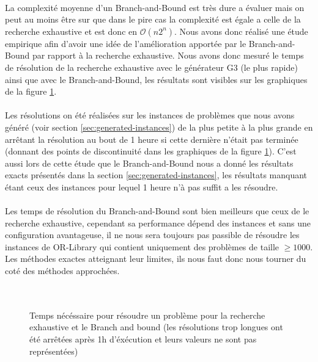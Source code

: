 \documentclass[12pt,letterpaper,twoside]{article}
\begin{document}
			\paragraph*{}
				La complexité moyenne d'un Branch-and-Bound est très dure a évaluer mais on peut au moins être sur que dans le pire cas la complexité est égale a celle de la recherche exhaustive et est donc en \(\mathcal{O}(n2^n)\). Nous avons donc réalisé une étude empirique afin d'avoir une idée de l'amélioration apportée par le Branch-and-Bound par rapport à la recherche exhaustive. Nous avons donc mesuré le temps de résolution de la recherche exhaustive avec le générateur G3 (le plus rapide) ainsi que avec le Branch-and-Bound, les résultats sont visibles sur les graphiques de la figure \ref{figure:plots/exhaustive_bnb_time}.
			\paragraph*{}
				Les résolutions on été réalisées sur les instances de problèmes que nous avons généré (voir section \ref{sec:generated-instances}) de la plus petite à la plus grande en arrêtant la résolution au bout de 1 heure si cette dernière n'était pas terminée (donnant des points de discontinuité dans les graphiques de la figure \ref{figure:plots/exhaustive_bnb_time}). C'est aussi lors de cette étude que le Branch-and-Bound nous a donné les résultats exacts présentés dans la section \ref{sec:generated-instances}, les résultats manquant étant ceux des instances pour lequel 1 heure n'à pas suffit a les résoudre.
			\paragraph*{}
				Les temps de résolution du Branch-and-Bound sont bien meilleurs que ceux de le recherche exhaustive, cependant sa performance dépend des instances et sans une configuration avantageuse, il ne nous sera toujours pas passible de résoudre les instances de OR-Library qui contient uniquement des problèmes de taille \(\ge 1000\). Les méthodes exactes atteignant leur limites, ils nous faut donc nous tourner du coté des méthodes approchées.
			\paragraph*{}
				\hfill{}
			\begin{figure}[H]
				\centering
				\\
				\caption{Temps nécéssaire pour résoudre un problème pour la recherche exhaustive et le Branch and bound (les résolutions trop longues ont été arrêtées après 1h d'éxécution et leurs valeurs ne sont pas représentées)}
				\label{figure:plots/exhaustive_bnb_time}
			\end{figure}
\end{document}
